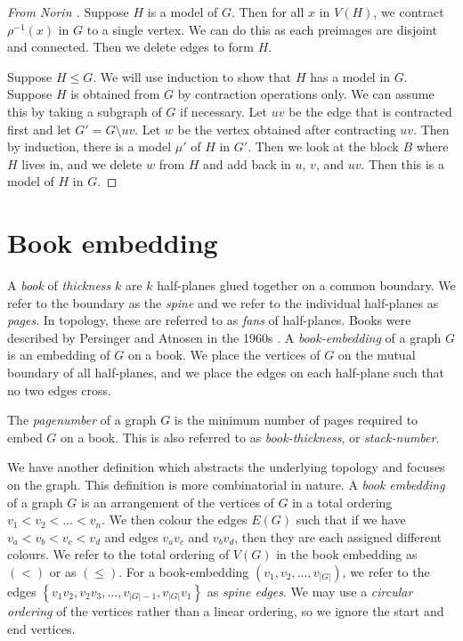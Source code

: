 \documentclass[]{report}
\theoremstyle{definition}
\numberwithin{theorem}{section}
\numberwithin{equation}{section}
\begin{document}
\begin{proof}[From Norin \cite{norinMath599GraphMinors2017}]
	Suppose $H$ is a model of $G$. Then for all $x$ in $V(H)$, we contract $\rho^{-1}(x)$ in $G$ to a single vertex. We can do this as each preimages are disjoint and connected. Then we delete edges to form $H$. 
	
	Suppose $H \leq G$. We will use induction to show that $H$ has a model in $G$. Suppose $H$ is obtained from $G$ by contraction operations only. We can assume this by taking a subgraph of $G$ if necessary. Let $uv$ be the edge that is contracted first and let $G' = G \setminus uv$. Let $w$ be the vertex obtained after contracting $uv$. Then by induction, there is a model $\mu'$ of $H$ in $G'$. Then we look at the block $B$ where $H$ lives in, and we delete $w$ from $H$ and add back in $u$, $v$, and $uv$. Then this is a model of $H$ in $G$. 
\end{proof}
\section{Book embedding}\label{sec:Book Embedding}
A \textit{book} of \textit{thickness} $k$ are $k$ half-planes glued together on a common boundary. We refer to the boundary as the \textit{spine} and we refer to the individual half-planes as \textit{pages}. In topology, these are referred to as \textit{fans} of half-planes. Books were described by Persinger and Atnosen in the 1960s \cite{persingerSubsetsNbooksE31966} \cite{atneosenOnedimensionalNleavedContinua1972}. 
A \textit{book-embedding} of a graph $G$ is an embedding of $G$ on a book. We place the vertices of $G$ on the mutual boundary of all half-planes, and we place the edges on each half-plane such that no two edges cross.

The \textit{pagenumber} of a graph $G$ is the minimum number of pages required to embed $G$ on a book. This is also referred to as \textit{book-thickness}, or \textit{stack-number}. 

We have another definition which abstracts the underlying topology and focuses on the graph. This definition is more combinatorial in nature. 
A \textit{book embedding} of a graph $G$ is an arrangement of the vertices of $G$ in a total ordering $v_1 < v_2 < ... < v_n$. We then colour the edges $E(G)$ such that if we have $v_a < v_b < v_c < v_d$ and edges $v_a v_c$ and $v_b v_d$, then they are each assigned different colours.
We refer to the total ordering of $V(G)$ in the book embedding as $(<)$ or as $(\leq)$. For a book-embedding $(v_1, v_2, ..., v_{|G|})$, we refer to the edges $\left\{v_1 v_2, v_2 v_3, ..., v_{|G| - 1}, v_{|G|}v_{1}\right\}$ as \textit{spine edges}.
We may use a \textit{circular ordering} of the vertices rather than a linear ordering, so we ignore the start and end vertices.
\end{document}
